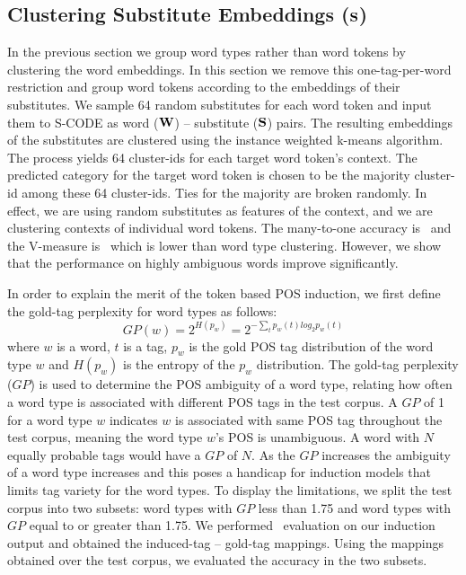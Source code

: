 \subsection{Clustering Substitute Embeddings (${\bf S}$)}
\label{sec:clustering-s}

In the previous section we group word types rather than word tokens by
clustering the word embeddings.  In this section we remove this
one-tag-per-word restriction and group word tokens according to the
embeddings of their substitutes.  We sample 64 random substitutes for
each word token and input them to S-CODE as word (${\bf W}$) --
substitute (${\bf S}$) pairs.  The resulting embeddings of the
substitutes are clustered using the instance weighted k-means
algorithm.  The process yields 64 cluster-ids for each target word
token's context.  The predicted category for the target word token is
chosen to be the majority cluster-id among these 64 cluster-ids.  Ties
for the majority are broken randomly.  In effect, we are using random
substitutes as features of the context, and we are clustering contexts
of individual word tokens.  The many-to-one accuracy is \wsymto\ and
the V-measure is \wsyvm\ which is lower than word type clustering.
However, we show that the performance on highly ambiguous words
improve significantly.

In order to explain the merit of the token based POS induction, we
first define the gold-tag perplexity for word types as follows:
\begin{equation} \label{eq:tag-perp}
GP(w) = 2^{H(p_w)} = 2^{-\sum_{t} p_w(t)log_2 p_w(t)}
\end{equation}
\noindent where $w$ is a word, $t$ is a tag, $p_w$ is the gold POS tag
distribution of the word type $w$ and $H(p_w)$ is the entropy of the
$p_w$ distribution.  The gold-tag perplexity ($GP$) is used to determine
the POS ambiguity of a word type, relating how often a word type is
associated with different POS tags in the test corpus.  A $GP$ of 1
for a word type $w$ indicates $w$ is associated with same POS tag
throughout the test corpus, meaning the word type $w$'s POS is
unambiguous.  A word with $N$ equally probable tags would have a $GP$
of $N$.  As the $GP$ increases the ambiguity of a word type increases and
this poses a handicap for induction models that limits tag variety for
the word types.  To display the limitations, we split the test corpus
into two subsets: word types with $GP$ less than 1.75 and word types
with $GP$ equal to or greater than 1.75.  We performed \mto\ evaluation
on our induction output and obtained the induced-tag -- gold-tag
mappings. Using the mappings obtained over the test corpus, we
evaluated the accuracy in the two subsets.

